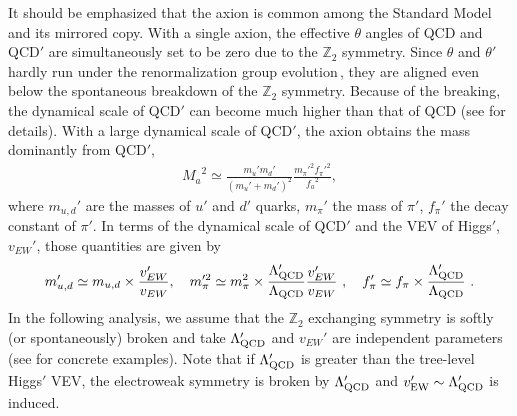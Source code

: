 \documentclass[aps,amsmath,preprint,epsf,superscriptaddress,nofootinbib,notitlepage]{revtex4-1}
\begin{document}
It should be emphasized that the axion is common among the Standard Model and its mirrored copy.
With a single axion, the effective $\theta$ angles of QCD and QCD${}'$ are simultaneously set to be zero
due to the $\mathbb Z_2$ symmetry. Since $\theta$ and $\theta'$ hardly run under the renormalization group evolution\,\cite{Ellis:1978hq}, 
they are aligned even below the spontaneous breakdown of the $\mathbb Z_2$ symmetry.
Because of the breaking, the dynamical scale of QCD$'$ can become much higher than that of QCD (see  \cite{Fukuda:2015ana} for details).
With a large dynamical scale of QCD$'$, the axion obtains the mass dominantly from QCD$'$,
\begin{eqnarray}
\label{eq:AxionMass}
{M_a}^2 \simeq \frac{m_u'm_d'}{(m_u' + m_d')^2}\frac{m_{\pi}'^2f_\pi'^2}{{f_a}^2},
\end{eqnarray}
where $m_{u,d}'$ are the masses of $u'$ and $d'$ quarks, $m_\pi'$ the mass of $\pi'$,
$f_\pi'$ the decay constant of $\pi'$.
In terms of the dynamical scale of QCD$'$ and the VEV of Higgs$'$, $v_{EW}'$,
those quantities are given by
\begin{eqnarray}
\label{eq:massprime}
m_{u,d}' \simeq m_{u,d} \times \frac{v_{EW}'}{v_{EW}}, \quad
m_{\pi}'^2 \simeq m_{\pi}^2 \times \frac{\Lambda_{\rm QCD}'}{\Lambda_{\rm QCD}} \frac{v_{EW}'} {v_{EW}} \ ,
\quad
f_{\pi}' \simeq f_{\pi} \times \frac{\Lambda_{\rm QCD}'}{\Lambda_{\rm QCD}} \ .
\end{eqnarray}
In the following analysis, we assume that  the $\mathbb Z_2$ exchanging symmetry is softly (or spontaneously) broken
and take $\Lambda_{\rm QCD}' $ and $v_{EW}'$ are independent parameters (see \cite{Fukuda:2015ana}
for concrete examples). Note that if $\Lambda'_{\rm QCD}$ is greater than the tree-level Higgs$'$ VEV, 
the electroweak symmetry is broken by $\Lambda'_{\rm QCD}$ and $v'_{\rm EW}\sim\Lambda'_{\rm QCD}$ is induced.
\end{document}
